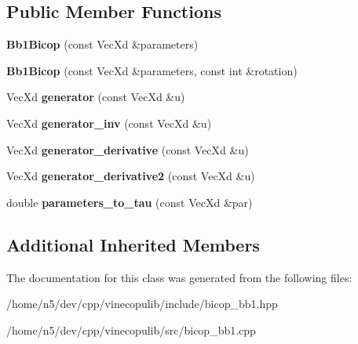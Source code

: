 \subsection*{Public Member Functions}
\begin{DoxyCompactItemize}
\item 
{\bfseries Bb1\+Bicop} (const Vec\+Xd \&parameters)\hypertarget{class_bb1_bicop_a0c3efb2b45ece6695e75a5186e9b7d5b}{}\label{class_bb1_bicop_a0c3efb2b45ece6695e75a5186e9b7d5b}

\item 
{\bfseries Bb1\+Bicop} (const Vec\+Xd \&parameters, const int \&rotation)\hypertarget{class_bb1_bicop_af12e3c65691728cbc8304e26345c8974}{}\label{class_bb1_bicop_af12e3c65691728cbc8304e26345c8974}

\item 
Vec\+Xd {\bfseries generator} (const Vec\+Xd \&u)\hypertarget{class_bb1_bicop_ac87047a969a5ca3a6548d23d0c16711b}{}\label{class_bb1_bicop_ac87047a969a5ca3a6548d23d0c16711b}

\item 
Vec\+Xd {\bfseries generator\+\_\+inv} (const Vec\+Xd \&u)\hypertarget{class_bb1_bicop_aa6c69a5d19f28d6832505dd48d3fa4e8}{}\label{class_bb1_bicop_aa6c69a5d19f28d6832505dd48d3fa4e8}

\item 
Vec\+Xd {\bfseries generator\+\_\+derivative} (const Vec\+Xd \&u)\hypertarget{class_bb1_bicop_a7e1bd159b0412e74b4420ef802207c3e}{}\label{class_bb1_bicop_a7e1bd159b0412e74b4420ef802207c3e}

\item 
Vec\+Xd {\bfseries generator\+\_\+derivative2} (const Vec\+Xd \&u)\hypertarget{class_bb1_bicop_ad8d2b10bf538a4a95afff99d7897745f}{}\label{class_bb1_bicop_ad8d2b10bf538a4a95afff99d7897745f}

\item 
double {\bfseries parameters\+\_\+to\+\_\+tau} (const Vec\+Xd \&par)\hypertarget{class_bb1_bicop_af57fdfff6d26ef5cfc22e1ce02b23be7}{}\label{class_bb1_bicop_af57fdfff6d26ef5cfc22e1ce02b23be7}

\end{DoxyCompactItemize}
\subsection*{Additional Inherited Members}


The documentation for this class was generated from the following files\+:\begin{DoxyCompactItemize}
\item 
/home/n5/dev/cpp/vinecopulib/include/bicop\+\_\+bb1.\+hpp\item 
/home/n5/dev/cpp/vinecopulib/src/bicop\+\_\+bb1.\+cpp\end{DoxyCompactItemize}
